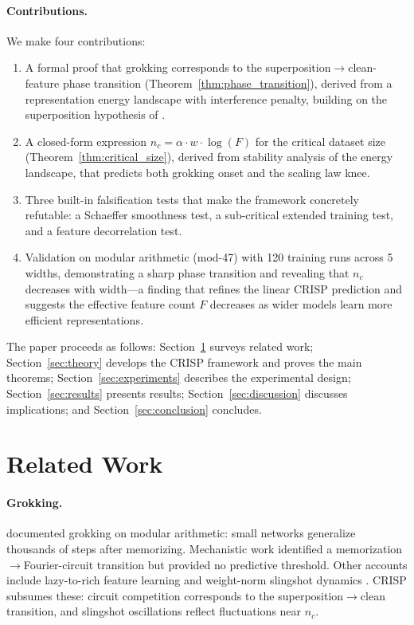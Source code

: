 \documentclass{article}
\newcommand{\nc}{n_c}
\newcommand{\Fnum}{F}
\begin{document}
\paragraph{Contributions.}
We make four contributions:
\begin{enumerate}
    \item[\textbf{C1.}] A formal proof that grokking corresponds to the superposition$\to$clean-feature phase transition (Theorem~\ref{thm:phase_transition}), derived from a representation energy landscape with interference penalty, building on the superposition hypothesis of \citet{elhage2022toy}.
    \item[\textbf{C2.}] A closed-form expression $\nc = \alpha \cdot w \cdot \log(\Fnum)$ for the critical dataset size (Theorem~\ref{thm:critical_size}), derived from stability analysis of the energy landscape, that predicts both grokking onset and the scaling law knee.
    \item[\textbf{C3.}] Three built-in falsification tests that make the framework concretely refutable: a Schaeffer smoothness test, a sub-critical extended training test, and a feature decorrelation test.
    \item[\textbf{C4.}] Validation on modular arithmetic (mod-47) with 120 training runs across 5 widths, demonstrating a sharp phase transition and revealing that $\nc$ decreases with width---a finding that refines the linear CRISP prediction and suggests the effective feature count $\Fnum$ decreases as wider models learn more efficient representations.
\end{enumerate}

The paper proceeds as follows: Section~\ref{sec:related} surveys related work; Section~\ref{sec:theory} develops the CRISP framework and proves the main theorems; Section~\ref{sec:experiments} describes the experimental design; Section~\ref{sec:results} presents results; Section~\ref{sec:discussion} discusses implications; and Section~\ref{sec:conclusion} concludes.


\section{Related Work}
\label{sec:related}

\paragraph{Grokking.}
\citet{power2022grokking} documented grokking on modular arithmetic: small networks generalize thousands of steps after memorizing. Mechanistic work \citep{nanda2023progress} identified a memorization$\to$Fourier-circuit transition but provided no predictive threshold. Other accounts include lazy-to-rich feature learning \citep{liu2023omnigrok} and weight-norm slingshot dynamics \citep{thilak2022slingshot}. CRISP subsumes these: circuit competition corresponds to the superposition$\to$clean transition, and slingshot oscillations reflect fluctuations near $\nc$.
\end{document}

